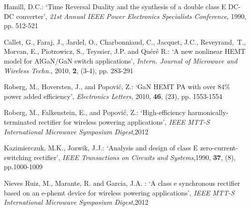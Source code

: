\documentclass[twocolumn]{el-author}
\begin{document}
\begin{thebibliography}{}

Hamill, D.C.: `Time Reversal Duality and the synthesis of a double class E DC-DC converter',
\textit{21st Annual IEEE Power Electronics Specialists Conference}, 1990, pp. 512-521

Callet, G.,  Faraj, J.,  Jardel, O.,  Charbonniaud, C.,  Jacquet, J.C., Reveyrand,~T., Morvan, E., Piotrowicz, S., Teyssier, J.P. and Qu\'er\'e R.: `A new nonlinear HEMT model for AlGaN/GaN switch applications',
\textit{Intern. Journal of Microwave and Wireless Techn.}, 2010, \textbf{2}, (3-4), pp. 283-291

Roberg, M., Hoversten, J., and Popovi\'c, Z.: `GaN HEMT PA with over 84\% power added efficiency',
\textit{Electronics Letters}, 2010,
\textbf{46}, (23), pp. 1553-1554

Roberg, M., Falkenstein, E., and Popovi\'c, Z.: `High-efficiency harmonically-terminated rectifier for wireless powering applications',
\textit{IEEE MTT-S International Microwave Symposium Digest},2012

Kazimierczuk, M.K., Jozwik, J.J.: `Analysis and design of class E zero-current-switching rectifier',
\textit{IEEE Transactions on Circuits and Systems},1990,
\textbf{37}, (8), pp.1000-1009


Nieves Ruiz, M., Marante, R. and Garcia, J.A.
: `A class e synchronous rectifier based on an e-phemt device for wireless powering applications',
\textit{IEEE MTT-S International Microwave Symposium Digest},2012




 


\end{thebibliography}
\end{document}
